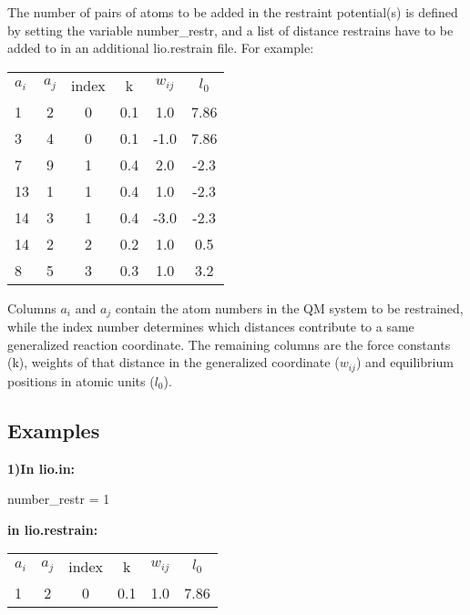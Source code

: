     The number of pairs of atoms to be added in the restraint potential(s) is defined by setting the variable number\_restr, and a list of distance restrains have to be added to in an additional lio.restrain file. For example:

    \begin{table}  [H]
      \begin{center}
      \begin{tabular}{ l c c c c c}
         $a_i$ & $a_j$ & index &   k  &    $w_{ij}$   &  $l_0$    \\
         1  &  2 &   0   &  0.1 &    1.0   & 7.86   \\
         3  &  4 &   0   &  0.1 &   -1.0   & 7.86   \\
         7  &  9 &   1   &  0.4 &    2.0   & -2.3   \\
         13 &  1 &   1   &  0.4 &    1.0   & -2.3   \\
         14 &  3 &   1   &  0.4 &   -3.0   & -2.3   \\
         14 &  2 &   2   &  0.2 &    1.0   & 0.5    \\
         8  &  5 &   3   &  0.3 &    1.0   & 3.2    \\
       \end{tabular}
       \end{center}
      \label{lio.restrain}
    \end{table}

Columns $a_i$ and $a_j$ contain the atom numbers in the QM system to be restrained, while the index number determines which distances contribute to a same generalized reaction coordinate. The remaining columns are the force constants (k), weights of that distance in the generalized coordinate ($w_{ij}$) and equilibrium positions in atomic units ($l_0$).

    \subsection{Examples}

    \textbf{1)In lio.in:}
    
    number\_restr = 1
    
        \textbf{in lio.restrain:}

    \begin{table}  [H]
      \begin{center}
      \begin{tabular}{ l c c c c c}
         $a_i$ & $a_j$ & index &   k  &    $w_{ij}$   &  $l_0$   \\
         1  &  2 &   0   &  0.1 &    1.0   & 7.86   \\
       \end{tabular}
       \end{center}
      \label{Tex1}
    \end{table}

